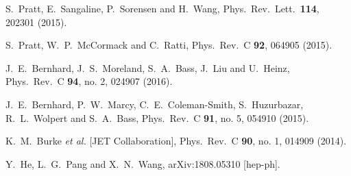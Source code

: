 \documentclass[aps,prc,nofootinbib,showpacs,superscriptaddress,groupedaddress]{revtex4-1}
\begin{document}
\begin{thebibliography}{99}
  S.~Pratt, E.~Sangaline, P.~Sorensen and H.~Wang,
  Phys.\ Rev.\ Lett.\  {\bf 114}, 202301 (2015).
  
	
  S.~Pratt, W.~P.~McCormack and C.~Ratti,
  Phys.\ Rev.\ C {\bf 92}, 064905 (2015).
  
  J.~E.~Bernhard, J.~S.~Moreland, S.~A.~Bass, J.~Liu and U.~Heinz,
  Phys.\ Rev.\ C {\bf 94}, no. 2, 024907 (2016).
  
  J.~E.~Bernhard, P.~W.~Marcy, C.~E.~Coleman-Smith, S.~Huzurbazar, R.~L.~Wolpert and S.~A.~Bass,
  Phys.\ Rev.\ C {\bf 91}, no. 5, 054910 (2015).

  K.~M.~Burke {\it et al.} [JET Collaboration],
  Phys.\ Rev.\ C {\bf 90}, no. 1, 014909 (2014).

  Y.~He, L.~G.~Pang and X.~N.~Wang,
  arXiv:1808.05310 [hep-ph].


\end{thebibliography}
\end{document}
